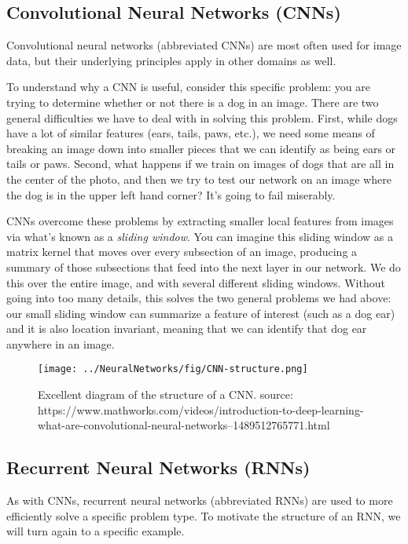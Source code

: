 \subsection{Convolutional Neural Networks (CNNs)}
Convolutional neural networks (abbreviated CNNs) are most often used for image data, but their underlying principles apply in other domains as well.

To understand why a CNN is useful, consider this specific problem: you are trying to determine whether or not there is a dog in an image. There are two general difficulties we have to deal with in solving this problem. First, while dogs have a lot of similar features (ears, tails, paws, etc.), we need some means of breaking an image down into smaller pieces that we can identify as being ears or tails or paws. Second, what happens if we train on images of dogs that are all in the center of the photo, and then we try to test our network on an image where the dog is in the upper left hand corner? It's going to fail miserably.

CNNs overcome these problems by extracting smaller local features from images via what's known as a \textit{sliding window}. You can imagine this sliding window as a matrix kernel that moves over every subsection of an image, producing a summary of those subsections that feed into the next layer in our network. We do this over the entire image, and with several different sliding windows. Without going into too many details, this solves the two general problems we had above: our small sliding window can summarize a feature of interest (such as a dog ear) and it is also location invariant, meaning that we can identify that dog ear anywhere in an image.

\begin{figure}
    \centering
    \texttt{[image: ../NeuralNetworks/fig/CNN-structure.png]}
    \caption{Excellent diagram of the structure of a CNN. source: https://www.mathworks.com/videos/introduction-to-deep-learning-what-are-convolutional-neural-networks--1489512765771.html}
    \label{fig:CNN-structre}
\end{figure}

\subsection{Recurrent Neural Networks (RNNs)}
As with CNNs, recurrent neural networks (abbreviated RNNs) are used to more efficiently solve a specific problem type. To motivate the structure of an RNN, we will turn again to a specific example.

